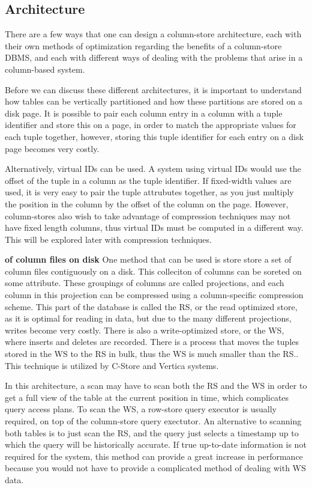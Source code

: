 \subsection*{Architecture}


There are a few ways that one can design a column-store architecture, each with their own methods of optimization regarding the benefits of a column-store DBMS, and each with different ways of dealing with the problems that arise in a column-based system.


Before we can discuss these different architectures, it is important to understand how tables can be vertically partitioned and how these partitions are stored on a disk page. It is possible to pair each column entry in a column with a tuple identifier and store this on a page, in order to match the appropriate values for each tuple together, however, storing this tuple identifier for each entry on a disk page becomes very costly. 


Alternatively, virtual IDs can be used. A system using virtual IDs would use the offset of the tuple in a column as the tuple identifier. If fixed-width values are used, it is very easy to pair the tuple attrubutes together, as you just multiply the position in the column by the offset of the column on the page\cite{now}. However, column-stores also wish to take advantage of compression techniques may not have fixed length columns, thus virtual IDs must be computed in a different way. This will be explored later with compression techniques.



	\textbf{of column files on disk} %
	One method that can be used is store store a set of column files contiguously on a disk. This colleciton of columns can be soreted on some attribute. These groupings of columns are called projections, and each column in this projection can be compressed using a column-specific compression scheme. This part of the database is called the RS, or the read optimized store, as it is optimal for reading in data, but due to the many different projections, writes become very costly. There is also a write-optimized store, or the WS, where inserts and deletes are recorded. There is a process that moves the tuples stored in the WS to the RS in bulk, thus the WS is much smaller than the RS.\cite{cstore}. This technique is utilized by C-Store and Vertica systems. 
	\par
	In this architecture, a scan may have to scan both the RS and the WS in order to get a full view of the table at the current position in time, which complicates query access plans. To scan the WS, a row-store query executor is usually required, on top of the column-store query exectutor. An alternative to scanning both tables is to just scan the RS, and the query just selects a timestamp up to which the query will be historically accurate. If true up-to-date information is not required for the system, this method can provide a great increase in performance because you would not have to provide a complicated method of dealing with WS data.



